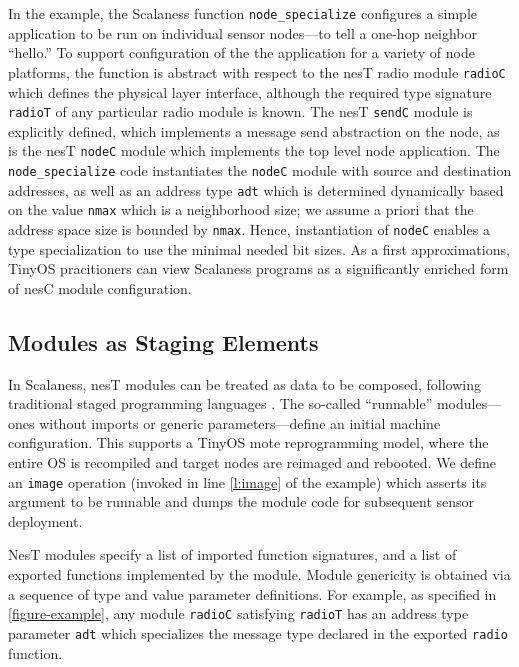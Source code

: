 In the example, the Scalaness function \texttt{node\_specialize} configures a simple application
to be run on individual sensor nodes---to tell a one-hop neighbor ``hello.'' To support
configuration of the the application for a variety of node platforms, the function is abstract
with respect to the nesT radio module \texttt{radioC} which defines the physical layer
interface, although the required type signature \texttt{radioT} of any particular radio module
is known. The nesT \texttt{sendC} module is explicitly defined, which implements a message send
abstraction on the node, as is the nesT \texttt{nodeC} module which implements the top level
node application. The \texttt{node\_specialize} code instantiates the \texttt{nodeC} module with
source and destination addresses, as well as an address type \texttt{adt} which is determined
dynamically based on the value \texttt{nmax} which is a neighborhood size; we assume a priori
that the address space size is bounded by \texttt{nmax}. Hence, instantiation of \texttt{nodeC}
enables a type specialization to use the minimal needed bit sizes. As a first approximations,
TinyOS pracitioners can view Scalaness programs as a significantly enriched form of nesC module
configuration.

\subsection{Modules as Staging Elements}

In Scalaness, nesT modules can be treated as data to be composed, following traditional staged
programming languages \cite{Taha-MetaML}. The so-called ``runnable'' modules---ones without
imports or generic parameters---define an initial machine configuration. This supports a TinyOS
mote reprogramming model, where the entire OS is recompiled and target nodes are reimaged and
rebooted. We define an \texttt{image} operation (invoked in line \ref{l:image} of the example)
which asserts its argument to be runnable and dumps the module code for subsequent sensor
deployment.

NesT modules specify a list of imported function signatures, and a list of exported functions
implemented by the module. Module genericity is obtained via a sequence of type and value
parameter definitions. For example, as specified in \autoref{figure-example}, any module
\texttt{radioC} satisfying \texttt{radioT} has an address type parameter \texttt{adt} which
specializes the message type declared in the exported \texttt{radio} function.

